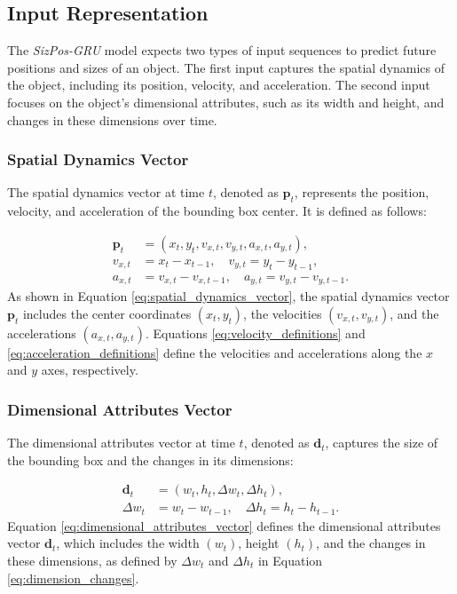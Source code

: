\documentclass[12pt,oneside]{book} %
\begin{document}
\subsection{Input Representation}
\noindent The \textit{SizPos-GRU} model expects two types of input sequences to predict future positions and sizes of an object. The first input captures the spatial dynamics of the object, including its position, velocity, and acceleration. The second input focuses on the object's dimensional attributes, such as its width and height, and changes in these dimensions over time.

\subsubsection*{Spatial Dynamics Vector}
\noindent The spatial dynamics vector at time $t$, denoted as $\mathbf{p}_t$, represents the position, velocity, and acceleration of the bounding box center. It is defined as follows:

\begin{align}
    \mathbf{p}_t & = \left(x_t, y_t, v_{x,t}, v_{y,t}, a_{x,t}, a_{y,t}\right), \label{eq:spatial_dynamics_vector} \\
    v_{x,t}      & = x_t - x_{t-1}, \quad v_{y,t} = y_t - y_{t-1}, \label{eq:velocity_definitions}                 \\
    a_{x,t}      & = v_{x,t} - v_{x,t-1}, \quad a_{y,t} = v_{y,t} - v_{y,t-1}. \label{eq:acceleration_definitions}
\end{align}
As shown in Equation \eqref{eq:spatial_dynamics_vector}, the spatial dynamics
vector $\mathbf{p}_t$ includes the center coordinates $(x_t, y_t)$, the
velocities $(v_{x,t}, v_{y,t})$, and the accelerations $(a_{x,t}, a_{y,t})$.
Equations \eqref{eq:velocity_definitions} and \eqref{eq:acceleration_definitions}
define the velocities and accelerations along the $x$ and $y$ axes,
respectively.

\subsubsection*{Dimensional Attributes Vector}
\noindent The dimensional attributes vector at time $t$, denoted as $\mathbf{d}_t$, captures the size of the bounding box and the changes in its dimensions:

\begin{align}
    \mathbf{d}_t & = \left(w_t, h_t, \Delta w_t, \Delta h_t\right), \label{eq:dimensional_attributes_vector} \\
    \Delta w_t   & = w_t - w_{t-1}, \quad \Delta h_t = h_t - h_{t-1}. \label{eq:dimension_changes}
\end{align}
Equation \eqref{eq:dimensional_attributes_vector} defines the dimensional
attributes vector $\mathbf{d}_t$, which includes the width $(w_t)$, height
$(h_t)$, and the changes in these dimensions, as defined by $\Delta w_t$ and
$\Delta h_t$ in Equation \eqref{eq:dimension_changes}.
\end{document}
